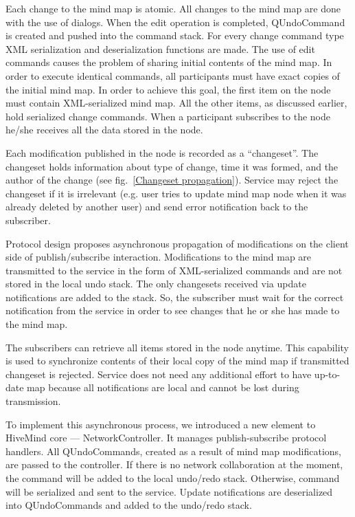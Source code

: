 Each change to the mind map is atomic. All changes to the mind map are done with
the use of dialogs. When the edit operation is completed, QUndoCommand is
created and pushed into the command stack. For every change command type XML
serialization and deserialization functions are made.  The use of edit commands
causes the problem of sharing initial contents of the mind map. In order to
execute identical commands, all participants must have exact copies of the
initial mind map. In order to achieve this goal, the first item on the node must
contain XML-serialized mind map. All the other items, as discussed earlier, hold
serialized change commands.  When a participant subscribes to the node he/she
receives all the data stored in the node.


Each modification published in the node is recorded as a ``changeset''. The
changeset holds information about type of change, time it was formed, and the
author of the change (see fig.~\ref{Changeset propagation}). Service may reject
the changeset if it is irrelevant (e.g. user tries to update mind map node when
it was already deleted by another user) and send error notification back to the
subscriber.

Protocol design proposes asynchronous propagation of modifications on the client
side of publish/subscribe interaction. Modifications to the mind map are
transmitted to the service in the form of XML-serialized commands and are not
stored in the local undo stack. The only changesets received via update
notifications are added to the stack. So, the subscriber must wait for the
correct notification from the service in order to see changes that he or she has
made to the mind map.

The subscribers can retrieve all items stored in the node anytime. This
capability is used to synchronize contents of their local copy of the mind map
if transmitted changeset is rejected. Service does not need any additional
effort to have up-to-date map because all notifications are local and cannot be
lost during transmission.

To implement this asynchronous process, we introduced a new element to HiveMind
core --- NetworkController. It manages publish-subscribe protocol handlers. All
QUndoCommands, created as a result of mind map modifications, are passed to the
controller. If there is no network collaboration at the moment, the command will
be added to the local undo/redo stack. Otherwise, command will be serialized and
sent to the service. Update notifications are deserialized into QUndoCommands
and added to the undo/redo stack.


